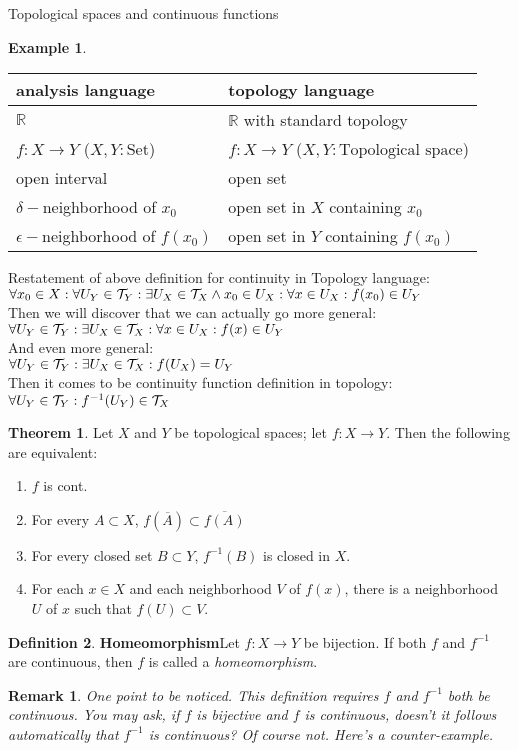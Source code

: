 \documentclass{report}
\newtheorem*{remark}{Remark}
\theoremstyle{definition}
\newtheorem{theorem}{Theorem}[chapter]
\newtheorem{definition}[theorem]{Definition}
\newtheorem{example}{Example}[theorem]
\newcommand{\defn}[1]{\textbf{#1}\label{#1}\index{#1}}
\newcommand{\RR}{\mathbb{R}}
\newcommand{\closure}[1]{\overline{#1}}
\begin{document}
\begin{chapter}{Topological spaces and continuous functions}
\begin{example}
    \begin{table}[H]
      \centering
      \begin{tabular}[H]{ll}
        analysis language & topology language \\
        \hline
        $\RR$ & $\RR$ with standard topology \\
        $f : X \to Y$ ($X,Y: \text{Set}$)
                          & $f : X \to Y$ ($X,Y: \text{Topological space}$) \\
        open interval & open set \\
        $\delta-$neighborhood of $x_0$
                          & open set in $X$ containing $x_0$ \\
        $\epsilon-$neighborhood of $f(x_0)$
                          & open set in $Y$ containing $f(x_0)$
      \end{tabular}
    \end{table}

    Restatement of above definition for continuity in Topology language: \\
    $\forall x_0\in X:\forall U_Y\in\mathcal{T}_Y:\exists U_X\in\mathcal{T}_X\land
    x_0\in U_X:\forall x\in U_X:f(x_0)\in U_Y$ \\
    Then we will discover that we can actually go more general: \\
    $\forall U_Y\in\mathcal{T}_Y:\exists U_X\in\mathcal{T}_X :\forall x\in U_X:f(x)\in
    U_Y$ \\
    And even more general: \\
    $\forall U_Y\in\mathcal{T}_Y:\exists U_X\in\mathcal{T}_X:f(U_X)=U_Y$ \\
    Then it comes to be continuity function definition in topology: \\
    $\forall U_Y\in\mathcal{T}_Y:f^{-1}(U_Y)\in\mathcal{T}_X$
  \end{example}
  \begin{theorem}
    Let $X$ and $Y$ be topological spaces; let $f:X\to Y$. Then the
    following are equivalent:
    \begin{enumerate}
    \item $f$ is cont.
    \item For every $A\subset X$,
      $f(\closure{A})\subset\closure{f(A)}$
    \item For every closed set $B\subset Y$, $f^{-1}(B)$ is closed in
      $X$.
    \item For each $x\in X$ and each neighborhood $V$ of $f(x)$, there
      is a neighborhood $U$ of $x$ such that $f(U)\subset V$.
    \end{enumerate}
  \end{theorem}
  \begin{definition}\defn{Homeomorphism}
    Let $f:X\to Y$ be bijection. If both $f$ and $f^{-1}$ are
    continuous, then $f$ is called a \emph{homeomorphism}.
  \end{definition}
  \begin{remark}
    One point to be noticed. This definition requires $f$ and $f^{-1}$
    both be continuous. You may ask, if $f$ is bijective and $f$ is
    continuous, doesn't it follows automatically that $f^{-1}$ is
    continuous? Of course not. Here's a counter-example.


\end{remark}
\end{chapter}
\end{document}
